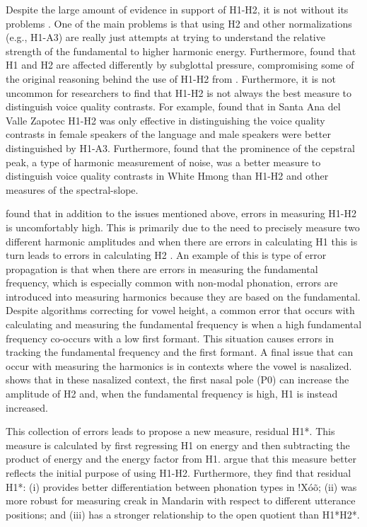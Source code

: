 Despite the large amount of evidence in support of H1-H2, it is not without its problems \citep{chaiH1H2Acoustic2022}. One of the main problems is that using H2 and other normalizations (e.g., H1-A3) are really just attempts at trying to understand the relative strength of the fundamental to higher harmonic energy. Furthermore, \citet{sundbergObjectiveCharacterizationPhonation2022} found that H1 and H2 are affected differently by subglottal pressure, compromising some of the original reasoning behind the use of H1-H2 from \citet{fischer-jorgensenPhoneticAnalysisBreathy1968}. Furthermore, it is not uncommon for researchers to find that H1-H2 is not always the best measure to distinguish voice quality contrasts. For example, \citet{espositoVariationContrastivePhonation2010} found that in Santa Ana del Valle Zapotec H1-H2 was only effective in distinguishing the voice quality contrasts in female speakers of the language and male speakers were better distinguished by H1-A3. Furthermore, \citet{garellekPhoneticsWhiteHmong2021} found that the prominence of the cepstral peak, a type of harmonic measurement of noise, was a better measure to distinguish voice quality contrasts in White Hmong than H1-H2 and other measures of the spectral-slope. 

\citet{chaiH1H2Acoustic2022} found that in addition to the issues mentioned above, errors in measuring H1-H2 is uncomfortably high. This is primarily due to the need to precisely measure two different harmonic amplitudes and when there are errors in calculating H1 this is turn leads to errors in calculating H2 \citep{arrasIntroductionErrorPropagation1998}. An example of this is type of error propagation is that when there are errors in measuring the fundamental frequency, which is especially common with non-modal phonation, errors are introduced into measuring harmonics because they are based on the fundamental. Despite algorithms correcting for vowel height, a common error that occurs with calculating and measuring the fundamental frequency is when a high fundamental frequency co-occurs with a low first formant. This situation causes errors in tracking the fundamental frequency and the first formant. A final issue that can occur with measuring the harmonics is in contexts where the vowel is nasalized. \citet{simpsonFirstSecondHarmonics2012} shows that in these nasalized context, the first nasal pole (P0) can increase the amplitude of H2 and, when the fundamental frequency is  high, H1 is instead increased. 

This collection of errors leads \citet{chaiH1H2Acoustic2022} to propose a new measure, residual H1*. This measure is calculated by first regressing H1 on energy and then subtracting the product of energy and the energy factor from H1. \citeauthor{chaiH1H2Acoustic2022} argue that this measure better reflects the initial purpose of using H1-H2. Furthermore, they find that residual H1*: (i) provides better differentiation between phonation types in !Xóõ; (ii) was more robust for measuring creak in Mandarin with respect to different utterance positions; and (iii) has a stronger relationship to the open quotient than H1*H2*.


